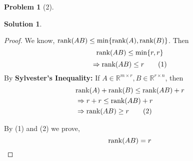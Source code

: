 \documentclass{amsart}[11pt]
\theoremstyle{definition}
\newtheorem*{problem}{Problem}
\newtheorem{solution}{Solution}
\newcommand{\R}{\mathbb{R}}
\newcommand{\rank}{\textnormal{rank}}
\begin{document}
\begin{problem}[2]
\begin{solution}
\begin{enumerate}[(a)]
\begin{proof}
            \noindent We know, $\rank(AB) \leq \min\{\rank(A), \rank(B)\}$. Then
            \[\rank(AB) \leq \min\{r, r\}\]
            \[\Rightarrow\rank(AB) \leq r\tag{1}\]
            By \textbf{Sylvester's Inequality:} If $A \in \R^{m\times r}, B \in \R^{r\times n}$, then 
            \begin{align*}
                &\rank(A) + \rank(B) \leq \rank(AB) + r \\
                &\Rightarrow r + r \leq \rank(AB) + r \\
                &\Rightarrow \rank(AB) \geq r \tag{2}
            \end{align*}

            By (1) and (2) we prove,
            \[\rank(AB) = r\]
        \end{proof}
    \end{enumerate}
\end{solution}
\end{problem}
\end{document}
